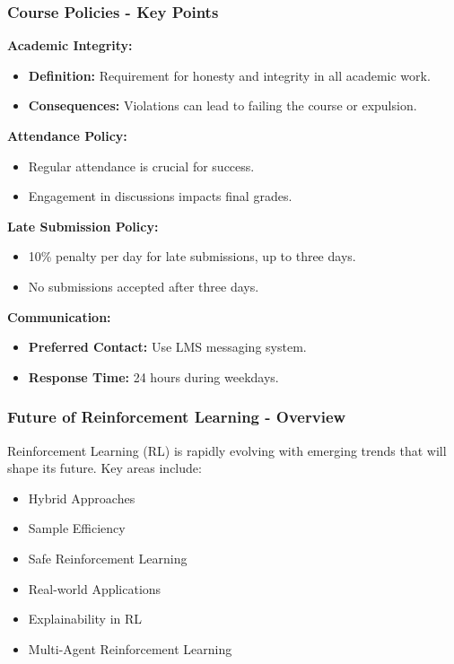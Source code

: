 \documentclass[aspectratio=169]{beamer}
\begin{document}
\begin{frame}[fragile]
  \frametitle{Course Policies - Key Points}
  \textbf{Academic Integrity:}
  \begin{itemize}
    \item \textbf{Definition:} Requirement for honesty and integrity in all academic work.
    \item \textbf{Consequences:} Violations can lead to failing the course or expulsion.
  \end{itemize}

  \textbf{Attendance Policy:}
  \begin{itemize}
    \item Regular attendance is crucial for success.
    \item Engagement in discussions impacts final grades.
  \end{itemize}

  \textbf{Late Submission Policy:}
  \begin{itemize}
    \item 10\% penalty per day for late submissions, up to three days.
    \item No submissions accepted after three days.
  \end{itemize}

  \textbf{Communication:}
  \begin{itemize}
    \item \textbf{Preferred Contact:} Use LMS messaging system.
    \item \textbf{Response Time:} 24 hours during weekdays.
  \end{itemize}
\end{frame}

\begin{frame}[fragile]
    \frametitle{Future of Reinforcement Learning - Overview}
    Reinforcement Learning (RL) is rapidly evolving with emerging trends that will  
    shape its future. Key areas include:
    \begin{itemize}
        \item Hybrid Approaches
        \item Sample Efficiency
        \item Safe Reinforcement Learning
        \item Real-world Applications
        \item Explainability in RL
        \item Multi-Agent Reinforcement Learning
    \end{itemize}
\end{frame}
\end{document}
